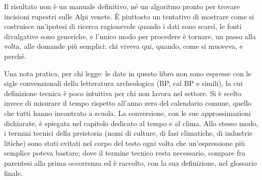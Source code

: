 Il risultato non è un manuale definitivo, né un algoritmo pronto per trovare incisioni rupestri sulle Alpi venete. È piuttosto un tentativo di mostrare come si costruisce un'ipotesi di ricerca ragionevole quando i dati sono scarsi, le fonti divulgative sono generiche, e l'unico modo per procedere è tornare, un passo alla volta, alle domande più semplici: chi viveva qui, quando, come si muoveva, e perché.

Una nota pratica, per chi legge: le date in questo libro non sono espresse con le sigle convenzionali della letteratura archeologica (BP, cal BP e simili), la cui definizione tecnica \`e poco intuitiva per chi non lavora nel settore. Si \`e scelto invece di misurare il tempo rispetto all'anno zero del calendario comune, quello che tutti hanno incontrato a scuola. La conversione, con le sue approssimazioni dichiarate, \`e spiegata nel capitolo dedicato al tempo e al clima. Allo stesso modo, i termini tecnici della preistoria (nomi di culture, di fasi climatiche, di industrie litiche) sono stati evitati nel corpo del testo ogni volta che un'espressione più semplice poteva bastare; dove il termine tecnico resta necessario, compare fra parentesi alla prima occorrenza ed è raccolto, con la sua definizione, nel glossario finale.
